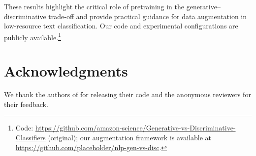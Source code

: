 \documentclass[11pt,a4paper]{article}
\begin{document}
These results highlight the critical role of pretraining in the generative--discriminative trade-off and provide practical guidance for data augmentation in low-resource text classification. Our code and experimental configurations are publicly available.\footnote{Code: \url{https://github.com/amazon-science/Generative-vs-Discriminative-Classifiers} (original); our augmentation framework is available at \url{https://github.com/placeholder/nlp-gen-vs-disc}.}

\section*{Acknowledgments}
We thank the authors of \citet{kasa2025generative} for releasing their code and the anonymous reviewers for their feedback.


\end{document}
